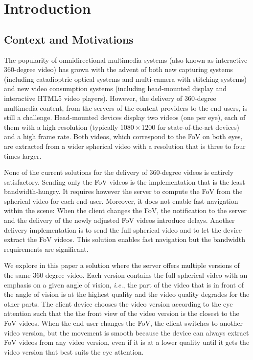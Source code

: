 \section{Introduction}
\label{sec:introduction}

\subsection{Context and Motivations}

The popularity of omnidirectional multimedia systems (also known as interactive 360-degree video) 
has grown with the advent of both new capturing systems
(including catadioptric optical systems and multi-camera with stitching systems) and new video
consumption systems (including head-mounted display and interactive HTML5 video players).
However, the delivery of 360-degree multimedia content, from the servers of the content providers
to the end-users,
is still a challenge. Head-mounted devices display two videos (one per
eye), each of them with a high resolution (typically $1080\times 1200$ for state-of-the-art devices)
and a high frame rate. Both videos, which correspond to the \ac{FoV} on both eyes, are extracted
from a wider spherical video with a resolution that is three to four times larger.

None of the current solutions for the delivery of 360-degree videos is entirely satisfactory. Sending only 
the  \ac{FoV} videos is the implementation that is the least bandwidth-hungry. It requires however the server to 
compute the \ac{FoV} from the spherical video for each end-user. Moreover, it does not enable fast
navigation within the scene: When the client changes the 
\ac{FoV}, the notification to the server and the delivery of the newly adjusted \ac{FoV} videos 
introduce delays. Another delivery implementation is to send the full spherical video and to let the device
extract the \ac{FoV} videos. This solution enables fast navigation but the bandwidth requirements are 
significant.

We explore in this paper a solution where the server offers multiple versions of the same 360-degree 
video. Each version contains the full spherical video with an emphasis on a given angle of vision, \textit{i.e.},
the part of the video that is in front of the angle of vision is at the highest quality and the video quality degrades
for the other parts. The client device chooses the video version according to the eye attention such that the 
the front view of the video version is the closest to the \ac{FoV} videos. When the end-user changes the 
\ac{FoV}, the client switches to another video version, but the movement is smooth because the device 
can always extract \ac{FoV} videos from any video version, even if it is at a lower quality until 
it gets the video version that best suits the eye attention.

